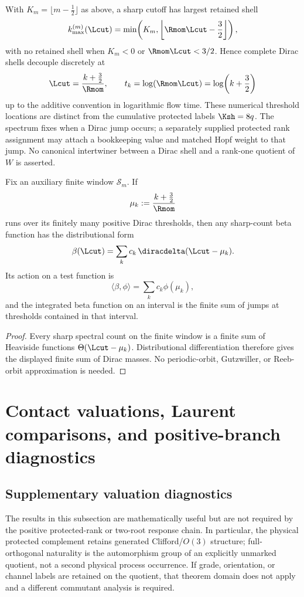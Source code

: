 \documentclass[11pt,a4paper]{article}
\begin{document}
\begin{corollary}
\label{paper3g:corollary:atlas-exact-finite-shell-threshold-staircase-f96297a}

With \(K_m=\lfloor m-\tfrac12\rfloor\) as above, a sharp cutoff has largest
retained shell
\[
k_{\max}^{(m)}(\Lcut)
=
\min\!\left(K_m,
\left\lfloor\Rmom\Lcut-\frac32\right\rfloor\right),
\]
with no retained shell when \(K_m<0\) or \(\Rmom\Lcut<3/2\).  Hence complete Dirac shells
decouple discretely at
\[
\Lcut=\frac{k+\frac32}{\Rmom},
\qquad
 t_k=\log(\Rmom\Lcut)=\log\!\left(k+\frac32\right)
\]
up to the additive convention in logarithmic flow time.  These numerical
threshold locations are distinct from the cumulative protected labels
\(\Ksh=8q\).  The spectrum fixes when a Dirac jump occurs; a separately
supplied protected rank assignment may attach a bookkeeping value and matched
Hopf weight to that jump.  No canonical intertwiner between a Dirac shell and
a rank-one quotient of \(W\) is asserted.
\end{corollary}

\begin{lemma}
\label{p3:lem:distributional-beta-functions}
Fix an auxiliary finite window \(\mathcal S_m\).  If
\[
        \mu_k:=\frac{k+\frac32}{\Rmom}
\]
runs over its finitely many positive Dirac thresholds, then any sharp-count
beta function has the distributional form
\[
        \beta(\Lcut)=\sum_k c_k\,\diracdelta(\Lcut-\mu_k).
\]
Its action on a test function is
\[
        \langle\beta,\phi\rangle=\sum_k c_k\phi(\mu_k),
\]
and the integrated beta function on an interval is the finite sum of jumps at
thresholds contained in that interval.
\end{lemma}

\begin{proof}
Every sharp spectral count on the finite window is a finite sum of Heaviside
functions \(\Theta(\Lcut-\mu_k)\).  Distributional differentiation therefore
gives the displayed finite sum of Dirac masses.  No periodic-orbit,
Gutzwiller, or Reeb-orbit approximation is needed.
\end{proof}


\section{Contact valuations, Laurent comparisons, and positive-branch diagnostics}
\label{p3g:sec:laurent}
\subsection{Supplementary valuation diagnostics}
\label{p3d:app:supplementary-valuations}
The results in this subsection are mathematically useful but are not required by
the positive protected-rank or two-root response chain.  In particular, the
physical protected complement retains generated Clifford/\(O(3)\) structure;
full-orthogonal naturality is the automorphism group of an explicitly unmarked
quotient, not a second physical process occurrence.  If grade, orientation, or
channel labels are retained on the quotient, that theorem domain does not
apply and a different commutant analysis is required.
\end{document}
